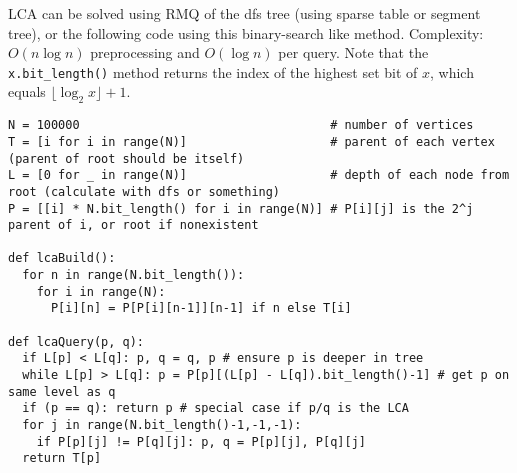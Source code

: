 \documentclass[letterpaper]{article}
\begin{document}
LCA can be solved using RMQ of the dfs tree (using sparse table or segment
tree), or the following code using this binary-search like method. Complexity:
$O\left(n\log n\right)$ preprocessing and $O\left(\log n\right)$ per query. Note
that the \texttt{x.bit\_length()} method returns the index of the highest set bit
of $x$, which equals $\lfloor \log_2 x \rfloor + 1$.

\begin{lstlisting}
N = 100000                                   # number of vertices
T = [i for i in range(N)]                    # parent of each vertex (parent of root should be itself)
L = [0 for _ in range(N)]                    # depth of each node from root (calculate with dfs or something)
P = [[i] * N.bit_length() for i in range(N)] # P[i][j] is the 2^j parent of i, or root if nonexistent

def lcaBuild():
  for n in range(N.bit_length()):
    for i in range(N):
      P[i][n] = P[P[i][n-1]][n-1] if n else T[i]

def lcaQuery(p, q):
  if L[p] < L[q]: p, q = q, p # ensure p is deeper in tree
  while L[p] > L[q]: p = P[p][(L[p] - L[q]).bit_length()-1] # get p on same level as q
  if (p == q): return p # special case if p/q is the LCA
  for j in range(N.bit_length()-1,-1,-1):
    if P[p][j] != P[q][j]: p, q = P[p][j], P[q][j]
  return T[p]
\end{lstlisting}
\end{document}
